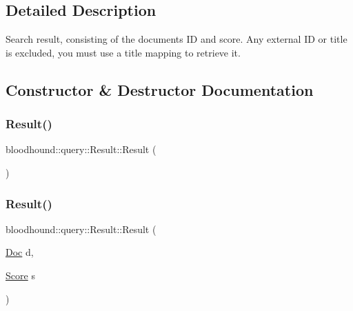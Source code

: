\subsection{Detailed Description}
Search result, consisting of the document\textquotesingle{}s ID and score. Any external ID or title is excluded, you must use a title mapping to retrieve it. 

\subsection{Constructor \& Destructor Documentation}
\mbox{\label{structbloodhound_1_1query_1_1Result_a6a9aaa804dbe3929b653b614e18408e1}} 
\subsubsection{\texorpdfstring{Result()}{Result()}\hspace{0.1cm}{\footnotesize\ttfamily [1/2]}}
{\footnotesize\ttfamily bloodhound\+::query\+::\+Result\+::\+Result (\begin{DoxyParamCaption}{ }\end{DoxyParamCaption})\hspace{0.3cm}{\ttfamily [default]}}

\mbox{\label{structbloodhound_1_1query_1_1Result_ac4c15cb4d9e60b3e7bf37bd813215f55}} 
\subsubsection{\texorpdfstring{Result()}{Result()}\hspace{0.1cm}{\footnotesize\ttfamily [2/2]}}
{\footnotesize\ttfamily bloodhound\+::query\+::\+Result\+::\+Result (\begin{DoxyParamCaption}\item[{\mbox{\hyperlink{structbloodhound_1_1Doc}{Doc}}}]{d,  }\item[{\mbox{\hyperlink{structbloodhound_1_1Score}{Score}}}]{s }\end{DoxyParamCaption})\hspace{0.3cm}{\ttfamily [inline]}}



